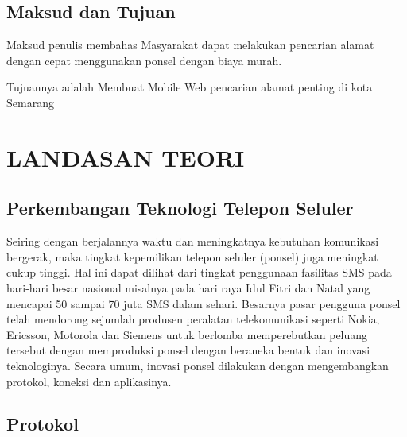 \documentclass{jtetiproposalskripsi}
\begin{document}
\section{Maksud dan Tujuan}

Maksud penulis membahas Masyarakat dapat melakukan pencarian alamat dengan cepat menggunakan ponsel dengan biaya murah. 


Tujuannya adalah Membuat Mobile Web pencarian alamat penting di kota Semarang 


\chapter{LANDASAN TEORI}                

\section{Perkembangan Teknologi Telepon Seluler}

	Seiring dengan berjalannya waktu dan meningkatnya kebutuhan komunikasi bergerak, maka tingkat kepemilikan telepon seluler (ponsel) juga meningkat cukup tinggi. Hal ini dapat dilihat dari tingkat penggunaan fasilitas SMS pada hari-hari besar nasional misalnya pada hari raya Idul Fitri dan Natal yang mencapai 50 sampai 70 juta SMS dalam sehari.
	Besarnya pasar pengguna ponsel telah mendorong sejumlah produsen peralatan telekomunikasi seperti Nokia, Ericsson, Motorola dan Siemens untuk berlomba memperebutkan peluang tersebut dengan memproduksi ponsel dengan beraneka bentuk dan inovasi teknologinya. Secara umum, inovasi ponsel dilakukan dengan mengembangkan protokol, koneksi dan aplikasinya.


\section{Protokol}
\end{document}
